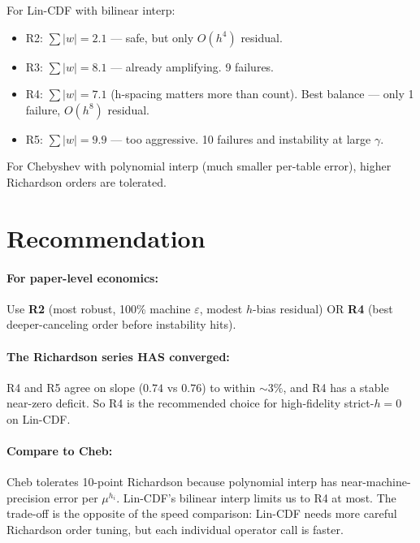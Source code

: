 \documentclass[11pt]{article}
\begin{document}
For Lin-CDF with bilinear interp:
\begin{itemize}
  \item R2: $\sum|w|=2.1$ — safe, but only $O(h^4)$ residual.
  \item R3: $\sum|w|=8.1$ — already amplifying. 9 failures.
  \item R4: $\sum|w|=7.1$ (h-spacing matters more than count). Best
        balance — only 1 failure, $O(h^8)$ residual.
  \item R5: $\sum|w|=9.9$ — too aggressive. 10 failures and instability
        at large $\gamma$.
\end{itemize}

For Chebyshev with polynomial interp (much smaller per-table error),
higher Richardson orders are tolerated.

\section{Recommendation}

\paragraph{For paper-level economics:} Use \textbf{R2} (most robust,
100\% machine $\varepsilon$, modest $h$-bias residual) OR \textbf{R4}
(best deeper-canceling order before instability hits).

\paragraph{The Richardson series HAS converged:} R4 and R5 agree on
slope ($0.74$ vs $0.76$) to within $\sim 3\%$, and R4 has a stable
near-zero deficit. So R4 is the recommended choice for high-fidelity
strict-$h{=}0$ on Lin-CDF.

\paragraph{Compare to Cheb:} Cheb tolerates 10-point Richardson because
polynomial interp has near-machine-precision error per $\mu^{h_i}$.
Lin-CDF's bilinear interp limits us to R4 at most. The trade-off is the
opposite of the speed comparison: Lin-CDF needs more careful Richardson
order tuning, but each individual operator call is faster.
\end{document}
